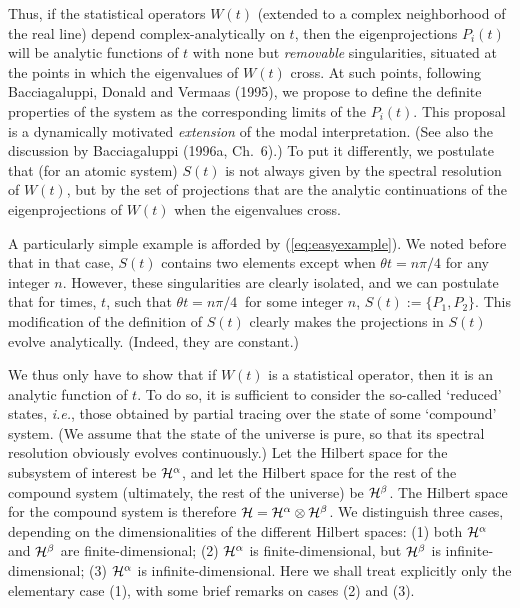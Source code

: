 \documentclass[12pt]{article}
\newcommand{\ie}{{\it i.e.}}         %
\newcommand{\cH}{\cal{H}}                                       %
\newcommand{\ga}{\alpha}                                        %
\newcommand{\gb}{\beta}                                         %
\begin{document}
Thus, if the statistical operators $W(t)$ (extended to a complex
neighborhood of the real line) depend complex-analytically on $t$,
then the eigenprojections $P_i(t)$ will be analytic functions of $t$
with none but {\em removable} singularities, situated at the points in
which the eigenvalues of $W(t)$ cross.  At such points, following
Bacciagaluppi, Donald and Vermaas (1995), we propose to define the
definite properties of the system as the corresponding limits of the
$P_i(t)$.  This proposal is a dynamically motivated {\em extension} of
the modal interpretation.  (See also the discussion by Bacciagaluppi
(1996a, Ch.~6).) To put it differently, we postulate that (for an
atomic system) $S(t)$ is not always given by the spectral resolution
of $W(t)$, but by the set of projections that are the analytic
continuations of the eigenprojections of $W(t)$ when the eigenvalues
cross.

A particularly simple example is afforded by (\ref{eq:easyexample}).
We noted before that in that case, $S(t)$ contains two elements except
when $\theta t = n\pi/4$ for any integer $n$.  However, these
singularities are clearly isolated, and we can postulate that for
times, $t$, such that $\theta t = n\pi/4\ $ for some integer $n$,
$S(t) := \{P_1, P_2\}$.  This modification of the definition of $S(t)$
clearly makes the projections in $S(t)$ evolve analytically.  (Indeed,
they are constant.)

We thus only have to show that if $W(t)$ is a statistical operator, 
then it is an analytic function of $t$.  To do so, it is sufficient to 
consider the so-called `reduced' states, \ie, those obtained by 
partial tracing over the state of some `compound' system.  (We assume 
that the state of the universe is pure, so that its spectral 
resolution obviously evolves continuously.) Let the Hilbert space for 
the subsystem of interest be $\cH^{\ga}$, and let the Hilbert space 
for the rest of the compound system (ultimately, the rest of the 
universe) be $\cH^{\gb}$.  The Hilbert space for the compound system 
is therefore $\cH = \cH^\ga \otimes \cH^\gb$.  We distinguish three 
cases, depending on the dimensionalities of the different Hilbert 
spaces: (1) both $\cH^\ga$ and $\cH^\gb$ are finite-dimensional; (2) 
$\cH^\ga$ is finite-dimensional, but $\cH^\gb$ is 
infinite-dimensional; (3) $\cH^\ga$ is infinite-dimensional.  Here we 
shall treat explicitly only the elementary case (1), with some brief 
remarks on cases (2) and (3).
\end{document}
